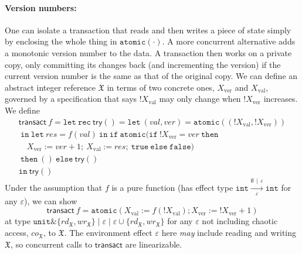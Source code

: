 \documentclass[nocopyrightspace,preprint]{sigplanconf}
\newcommand{\keywd}[1]{\mathtt{#1}}
\newcommand{\myread}[1]{!{#1}}
\newcommand{\myeffto}[3]{\xrightarrow[#2]{#1\,\mid\, #3}}
\newcommand{\mtrue}{\keywd{true}}
\newcommand{\mfalse}{\keywd{false}}
\newcommand{\inttype}{\keywd{int}}
\newcommand{\unittype}{\keywd{unit}}
\newcommand{\unitval}{\keywd{()}}
\newcommand{\myatomic}[1]{\keywd{atomic}(#1)}
\newcommand{\eff}{\varepsilon}
\newcommand{\rEff}[1]{\ensuremath{\mathit{rd}_{#1}}}
\newcommand{\cEff}[1]{\ensuremath{\mathit{co}_{#1}}}
\newcommand{\wEff}[1]{\ensuremath{\mathit{wr}_{#1}}}
\newcommand{\cloc}{\ensuremath{X}\xspace}
\begin{document}
\paragraph{Version numbers:}
\newcommand{\clocver}{{\cloc}_{\textrm{ver}}}
\newcommand{\clocval}{{\cloc}_{\textrm{val}}}
One can isolate a transaction that reads and then writes a piece of state simply by enclosing the whole thing in $\myatomic{\cdot}$. A more concurrent alternative adds a monotonic version number to the data. A transaction then works on a private copy, only committing its changes back (and incrementing the version) if the current version number is the same as that of the original copy. We can define an abstract integer reference $\mathfrak{X}$ in terms of two concrete ones, $\clocver$ and $\clocval$, governed by a specification that says  $\myread{\clocval}$ may only change when $\myread{\clocver}$ increases. We define 
\[\begin{array}{l}
\mathsf{transact}~f = \keywd{let\ rec}~\mathsf{try}()= \keywd{let}~(val,ver)=\myatomic{(\myread{\clocval},\myread{\clocver})}\\
\ \keywd{in}~\keywd{let}~res = f(val)\ \keywd{in\ if\ atomic }(\keywd{if}\ \myread{\clocver}=ver\ \keywd{then}\\
\quad \clocver := ver+1;\ \clocval := res;\ \mtrue\ \keywd{else}\ \mfalse)\\
\ \keywd{then}\ \unitval\ \keywd{else}\ \mathsf{try}\unitval\\
\keywd{in}\ \mathsf{try}()
\end{array}
\]
Under the assumption that $f$ is a pure function (has effect type $\inttype\myeffto{\emptyset}{\eff}{\eff}\inttype$ for any $\eff$), we can show
\[
\mathsf{transact}~f = \myatomic{\clocval := f(\myread{\clocval}); \clocver := \myread{\clocver}+1}
\]
at type $\unittype \& \{\rEff{\mathfrak{X}},\wEff{\mathfrak{X}}\} \mid \eff \mid \eff\cup\{\rEff{\mathfrak{X}},\wEff{\mathfrak{X}}\}$ for any $\eff$ not including chaotic access, $\cEff{\mathfrak{X}}$, to $\mathfrak{X}$. The environment effect $\eff$ here \emph{may} include reading and writing $\mathfrak{X}$, so concurrent calls to $\mathsf{transact}$ are linearizable. 
\end{document}

